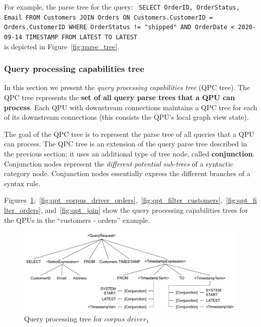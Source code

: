 \noindent
For example, the parse tree for the query:
{\obeylines\obeyspaces
\texttt{
        SELECT OrderID, OrderStatus, Email
        FROM Customers JOIN Orders ON Customers.CustomerID = Orders.CustomerID
        WHERE OrderStatus != "shipped" AND OrderDate < 2020-09-14
        TIMESTAMP FROM LATEST TO LATEST
        }}
~ \\
\noindent
is depicted in Figure~\ref{fig:parse_tree}.

\subsubsection{Query processing capabilities tree}
\label{sec:qpc_tree}


In this section we present the \textit{query processing capabilities tree} (QPC tree).
The QPC tree represents the \textbf{set of all query parse trees that a QPU can process}.
Each QPU with downstream connections maintains a QPC tree for each of its downstream connections
(this consists the QPU's local graph view state).

The goal of the QPC tree is to represent the parse tree of all queries that a QPU can process.
The QPC tree is an extension of the query parse tree described in the previous section;
it uses an additional type of tree node, called \textbf{conjunction}.
Conjunction nodes represent the \textit{different potential sub-trees} of a syntactic category node.
Conjunction nodes essentially express the different branches of a syntax rule.

Figures~\ref{fig:qpt_corpus_driver_customers},~\ref{fig:qpt_corpus_driver_orders},~\ref{fig:qpt_filter_customers},~\ref{fig:qpt_filter_orders}, and~\ref{fig:qpt_join}
show the query processing capabilities trees for the QPUs in the ``customers - orders'' example.

\begin{figure}[t]
  \centering
    \includegraphics[width=\textwidth]{./figures/design_pattern/qpt_corpus_driver_customers.pdf}
  \caption{Query processing tree for $corpus$ $driver_1$}
  \label{fig:qpt_corpus_driver_customers}
\end{figure}

